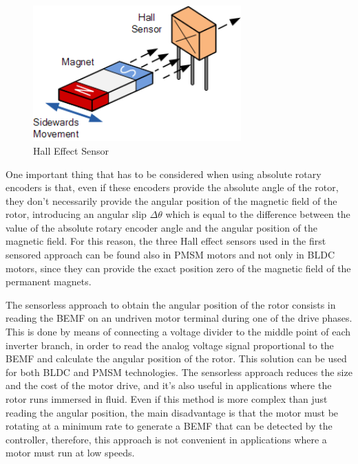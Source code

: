 \begin{figure}[htbp]
\centering
\includegraphics[width=8cm]{Images/hall_effect.png} 
\caption[Hall Effect Sensor]{Hall Effect Sensor}
\label{fig:hall_effect}
\end{figure}

One important thing that has to be considered when using absolute rotary encoders is that, even if these encoders provide the absolute angle of the rotor, they don't necessarily provide the angular position of the magnetic field of the rotor, introducing an angular slip $\Delta \theta$ which is equal to the difference between the value of the absolute rotary encoder angle and the angular position of the magnetic field. For this reason, the three Hall effect sensors used in the first sensored approach can be found also in \ac{PMSM} motors and not only in \ac{BLDC} motors, since they can provide the exact position zero of the magnetic field of the permanent magnets.

The sensorless approach to obtain the angular position of the rotor consists in reading the \ac{BEMF} on an undriven motor terminal during one of the drive phases. This is done by means of connecting a voltage divider to the middle point of each inverter branch, in order to read the analog voltage signal proportional to the \ac{BEMF} and calculate the angular position of the rotor. This solution can be used for both \ac{BLDC} and \ac{PMSM} technologies. The sensorless approach reduces the size and the cost of the motor drive, and it's also useful in applications where the rotor runs immersed in fluid. Even if this method is more complex than just reading the angular position, the main disadvantage is that the motor must be rotating at a minimum rate to generate a \ac{BEMF} that can be detected by the controller, therefore, this approach is not convenient in applications where a motor must run at low speeds.

